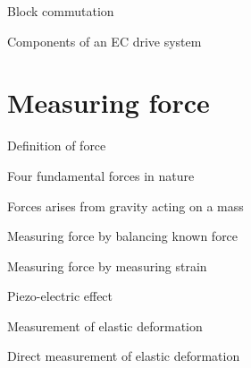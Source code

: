 \documentclass[compress]{beamer}
\begin{document}
{
    \begin{frame}{Block commutation}
    \end{frame}
}

{
    \begin{frame}{Components of an EC drive system}
    \end{frame}
}

\section{Measuring force}

{
    \begin{frame}{Definition of force}
    \end{frame}
}

{
    \begin{frame}{Four fundamental forces in nature}
    \end{frame}
}

{
    \begin{frame}{Forces arises from gravity acting on a mass}
    \end{frame}
}

{
    \begin{frame}{Measuring force by balancing known force}
    \end{frame}
}

{
    \begin{frame}{Measuring force by measuring strain}
    \end{frame}
}

{
    \begin{frame}{Piezo-electric effect}
    \end{frame}
}

{
    \begin{frame}{Measurement of elastic deformation}
    \end{frame}
}

{
    \begin{frame}{Direct measurement of elastic deformation}
    \end{frame}
}
\end{document}
